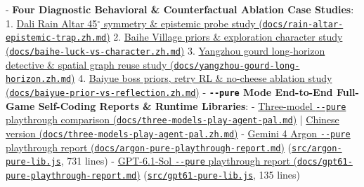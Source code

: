 \documentclass[11pt,a4paper]{article}
\begin{document}
- \textbf{Four Diagnostic Behavioral \& Counterfactual Ablation Case Studies}:
  1. \href{./rain-altar-epistemic-trap.zh.md}{Dali Rain Altar 45\ensuremath{^\circ} symmetry \& epistemic probe study (\texttt{docs\allowbreak{}/\allowbreak{}rain\allowbreak{}-\allowbreak{}altar\allowbreak{}-\allowbreak{}epistemic\allowbreak{}-\allowbreak{}trap\allowbreak{}.\allowbreak{}zh\allowbreak{}.\allowbreak{}md})}
  2. \href{./baihe-luck-vs-character.zh.md}{Baihe Village priors \& exploration character study (\texttt{docs\allowbreak{}/\allowbreak{}baihe\allowbreak{}-\allowbreak{}luck\allowbreak{}-\allowbreak{}vs\allowbreak{}-\allowbreak{}character\allowbreak{}.\allowbreak{}zh\allowbreak{}.\allowbreak{}md})}
  3. \href{./yangzhou-gourd-long-horizon.zh.md}{Yangzhou gourd long-horizon detective \& spatial graph reuse study (\texttt{docs\allowbreak{}/\allowbreak{}yangzhou\allowbreak{}-\allowbreak{}gourd\allowbreak{}-\allowbreak{}long\allowbreak{}-\allowbreak{}horizon\allowbreak{}.\allowbreak{}zh\allowbreak{}.\allowbreak{}md})}
  4. \href{./baiyue-prior-vs-reflection.zh.md}{Baiyue boss priors, retry RL \& no-cheese ablation study (\texttt{docs\allowbreak{}/\allowbreak{}baiyue\allowbreak{}-\allowbreak{}prior\allowbreak{}-\allowbreak{}vs\allowbreak{}-\allowbreak{}reflection\allowbreak{}.\allowbreak{}zh\allowbreak{}.\allowbreak{}md})}
- \textbf{\texttt{-\allowbreak{}-\allowbreak{}pure} Mode End-to-End Full-Game Self-Coding Reports \& Runtime Libraries}:
  - \href{./three-models-play-agent-pal.md}{Three-model \texttt{-\allowbreak{}-\allowbreak{}pure} playthrough comparison (\texttt{docs\allowbreak{}/\allowbreak{}three\allowbreak{}-\allowbreak{}models\allowbreak{}-\allowbreak{}play\allowbreak{}-\allowbreak{}agent\allowbreak{}-\allowbreak{}pal\allowbreak{}.\allowbreak{}md})} | \href{./three-models-play-agent-pal.zh.md}{Chinese version (\texttt{docs\allowbreak{}/\allowbreak{}three\allowbreak{}-\allowbreak{}models\allowbreak{}-\allowbreak{}play\allowbreak{}-\allowbreak{}agent\allowbreak{}-\allowbreak{}pal\allowbreak{}.\allowbreak{}zh\allowbreak{}.\allowbreak{}md})}
  - \href{./argon-pure-playthrough-report.md}{Gemini 4 Argon \texttt{-\allowbreak{}-\allowbreak{}pure} playthrough report (\texttt{docs\allowbreak{}/\allowbreak{}argon\allowbreak{}-\allowbreak{}pure\allowbreak{}-\allowbreak{}playthro\allowbreak{}ugh\allowbreak{}-\allowbreak{}report\allowbreak{}.\allowbreak{}md})} (\href{../src/argon-pure-lib.js}{\texttt{src\allowbreak{}/\allowbreak{}argon\allowbreak{}-\allowbreak{}pure\allowbreak{}-\allowbreak{}lib\allowbreak{}.\allowbreak{}js}}, 731 lines)
  - \href{./gpt61-pure-playthrough-report.md}{GPT-6.1-Sol \texttt{-\allowbreak{}-\allowbreak{}pure} playthrough report (\texttt{docs\allowbreak{}/\allowbreak{}gpt61\allowbreak{}-\allowbreak{}pure\allowbreak{}-\allowbreak{}playthro\allowbreak{}ugh\allowbreak{}-\allowbreak{}report\allowbreak{}.\allowbreak{}md})} (\href{../src/gpt61-pure-lib.js}{\texttt{src\allowbreak{}/\allowbreak{}gpt61\allowbreak{}-\allowbreak{}pure\allowbreak{}-\allowbreak{}lib\allowbreak{}.\allowbreak{}js}}, 135 lines)
\end{document}
